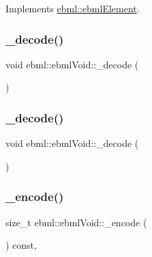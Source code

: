 Implements \mbox{\hyperlink{classebml_1_1ebmlElement_a3ebe3aa75b62971f385c01f27c807a02}{ebml\+::ebml\+Element}}.

\mbox{\label{classebml_1_1ebmlVoid_a4d5d56b3b45c18c5732a4e0d68762f87}} 
\subsubsection{\texorpdfstring{\+\_\+decode()}{\_decode()}\hspace{0.1cm}{\footnotesize\ttfamily [1/2]}}
{\footnotesize\ttfamily void ebml\+::ebml\+Void\+::\+\_\+decode (\begin{DoxyParamCaption}\item[{const \mbox{\hyperlink{classebml_1_1parseString}{parse\+String}} \&}]{ }\end{DoxyParamCaption})\hspace{0.3cm}{\ttfamily [protected]}}

\mbox{\label{classebml_1_1ebmlVoid_a3bf4c4cb979b33f513fd224329aee162}} 
\subsubsection{\texorpdfstring{\+\_\+decode()}{\_decode()}\hspace{0.1cm}{\footnotesize\ttfamily [2/2]}}
{\footnotesize\ttfamily void ebml\+::ebml\+Void\+::\+\_\+decode (\begin{DoxyParamCaption}\item[{const \mbox{\hyperlink{classebml_1_1parseFile}{parse\+File}} \&}]{ }\end{DoxyParamCaption})\hspace{0.3cm}{\ttfamily [protected]}}

\mbox{\label{classebml_1_1ebmlVoid_a58183338cb3b41b188cddfbb09a281d5}} 
\subsubsection{\texorpdfstring{\+\_\+encode()}{\_encode()}}
{\footnotesize\ttfamily size\+\_\+t ebml\+::ebml\+Void\+::\+\_\+encode (\begin{DoxyParamCaption}\item[{char $\ast$}]{ }\end{DoxyParamCaption}) const\hspace{0.3cm}{\ttfamily [protected]}, {\ttfamily [virtual]}}



